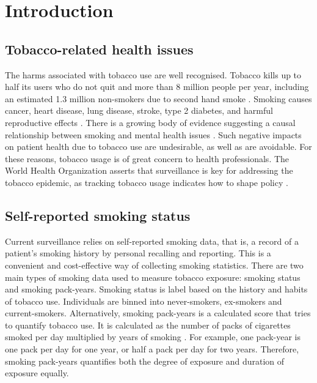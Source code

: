 \documentclass{article} %
\begin{document}
\newpage
\tableofcontents

\listoffigures
\listoftables
\listofequations

\newpage
{}

\section{Introduction}
\subsection{Tobacco-related health issues}
The harms associated with tobacco use are well recognised. Tobacco kills up to half its users who do not quit and more than 8 million people per year, including an estimated 1.3 million non-smokers due to second hand smoke \cite{who_tobacco}. Smoking causes cancer, heart disease, lung disease, stroke, type 2 diabetes, and harmful reproductive effects \cite{hhs_smoking_2014}. There is a growing body of evidence suggesting a causal relationship between smoking and mental health issues \cite{taylor2019smoking}. Such negative impacts on patient health due to tobacco use are undesirable, as well as are avoidable. For these reasons, tobacco usage is of great concern to health professionals. The World Health Organization asserts that surveillance is key for addressing the tobacco epidemic, as tracking tobacco usage indicates how to shape policy \cite{who_tobacco}.

\subsection{Self-reported smoking status} \label{sec:srss}
Current surveillance relies on self-reported smoking data, that is, a record of a patient's smoking history by personal recalling and reporting. This is a convenient and cost-effective way of collecting smoking statistics. There are two main types of smoking data used to measure tobacco exposure: smoking status and smoking pack-years. Smoking status is label based on the history and habits of tobacco use. Individuals are binned into never-smokers, ex-smokers and current-smokers. Alternatively, smoking pack-years is a calculated score that tries to quantify tobacco use. It is calculated as the number of packs of cigarettes smoked per day multiplied by years of smoking \cite{smokingpackyears}. For example, one pack-year is one pack per day for one year, or half a pack per day for two years. Therefore, smoking pack-years quantifies both the degree of exposure and duration of exposure equally.
\end{document}
